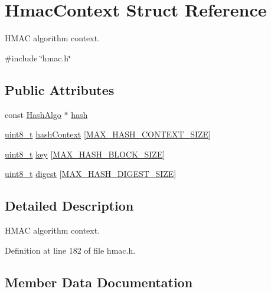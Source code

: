 \hypertarget{structHmacContext}{}\section{Hmac\+Context Struct Reference}
\label{structHmacContext}


H\+M\+AC algorithm context.  




{\ttfamily \#include \char`\"{}hmac.\+h\char`\"{}}

\subsection*{Public Attributes}
\begin{DoxyCompactItemize}
\item 
const \hyperlink{structHashAlgo}{Hash\+Algo} $\ast$ \hyperlink{structHmacContext_a2ef1bb0b311b25ed49f6a93f6c005923}{hash}
\item 
\hyperlink{stdint_8h_aba7bc1797add20fe3efdf37ced1182c5}{uint8\+\_\+t} \hyperlink{structHmacContext_a42051eba96f3c98ad95efba44e54032a}{hash\+Context} \mbox{[}\hyperlink{cyclone__crypto_2core_2crypto_8h_a17bccd72e42ecb723e28314749fb1638}{M\+A\+X\+\_\+\+H\+A\+S\+H\+\_\+\+C\+O\+N\+T\+E\+X\+T\+\_\+\+S\+I\+ZE}\mbox{]}
\item 
\hyperlink{stdint_8h_aba7bc1797add20fe3efdf37ced1182c5}{uint8\+\_\+t} \hyperlink{structHmacContext_a7c5f7de439ad6d53360bbc2d076c931f}{key} \mbox{[}\hyperlink{cyclone__crypto_2core_2crypto_8h_ae0b1ccdf219b4a384f11d5218755a9ab}{M\+A\+X\+\_\+\+H\+A\+S\+H\+\_\+\+B\+L\+O\+C\+K\+\_\+\+S\+I\+ZE}\mbox{]}
\item 
\hyperlink{stdint_8h_aba7bc1797add20fe3efdf37ced1182c5}{uint8\+\_\+t} \hyperlink{structHmacContext_a8d7c8cb8814b1cfe2dee045d26077c72}{digest} \mbox{[}\hyperlink{cyclone__crypto_2core_2crypto_8h_ac6e85336237dcdf8efb9280b84e4ffd6}{M\+A\+X\+\_\+\+H\+A\+S\+H\+\_\+\+D\+I\+G\+E\+S\+T\+\_\+\+S\+I\+ZE}\mbox{]}
\end{DoxyCompactItemize}


\subsection{Detailed Description}
H\+M\+AC algorithm context. 

Definition at line 182 of file hmac.\+h.



\subsection{Member Data Documentation}
\mbox{\label{structHmacContext_a8d7c8cb8814b1cfe2dee045d26077c72}} 
